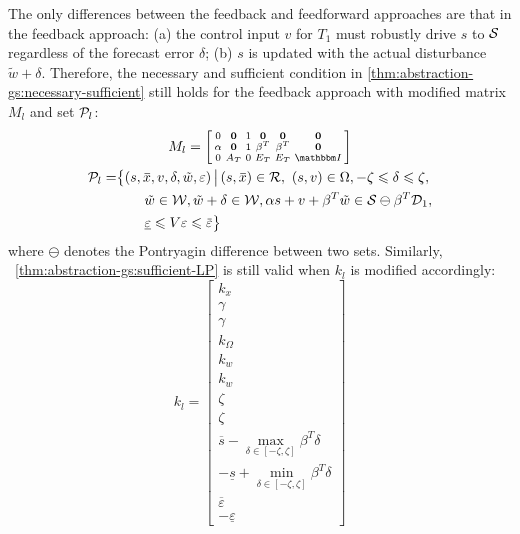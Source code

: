 The only differences between the feedback and feedforward approaches are that in the feedback approach: (a) the control input $v$ for $T_{1}$ must robustly drive $s$ to $\mathcal{S}$ regardless of the forecast error $\delta$; (b) $s$ is updated with the actual disturbance $\tilde{w} + \delta$.
Therefore, the necessary and sufficient condition in \cref{thm:abstraction-gs:necessary-sufficient} still holds for the feedback approach with modified matrix $M_{l}$ and set $\mathcal{P}_{l}$:
\begin{gather*}
  M_l = \left[
  \begin{smallmatrix}
    0 & \Zero & 1 & \Zero & \Zero & \Zero \\
    \alpha & \Zero & 1 & \beta^{T} & \beta^{T} & \Zero \\
    0 & A_T & 0 & E_T & E_T & \IdentityMatrix
  \end{smallmatrix} \right]\\
  \begin{aligned}
    \PSet_l =& \big\{ (s,\overbar{x}, v, \delta, \tilde{w}, \varepsilon) \,\big|\,
    (s,\overbar{x}) \in \RSet,\ (s,v) \in \Omega, -\zeta \leqslant \delta \leqslant \zeta,\big.\\
    &\qquad \big. \tilde{w} \in \WSet, \tilde{w} + \delta \in \WSet, \alpha s + v + \beta^{T} \tilde{w} \in \SSet \ominus \beta^{T} \mathcal{D}_{1},\\
    &\qquad \underline{\varepsilon} \leqslant V \varepsilon \leqslant \overbar{\varepsilon} \big\}
  \end{aligned}
\end{gather*}
where $\ominus$ denotes the Pontryagin difference between two sets.
Similarly, ~\cref{thm:abstraction-gs:sufficient-LP} is still valid when $k_{l}$ is modified accordingly:
\begin{equation*}
    k_{l} =
    \left[ \begin{smallmatrix}
      k_{x} \\
      \gamma \\
      \gamma \\
      k_{\Omega} \\
      k_{w} \\
      k_{w} \\
      \zeta \\
      \zeta \\
      \overbar{s} - \max_{\delta \in [-\zeta, \zeta]} \beta^{T} \delta\\
      -\underline{s} + \min_{\delta \in [-\zeta, \zeta]} \beta^{T} \delta\\
      \overbar{\varepsilon} \\
      -\underline{\varepsilon} 
    \end{smallmatrix} \right]
  \end{equation*}


